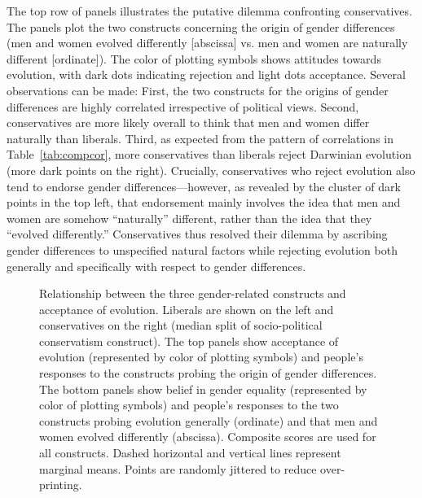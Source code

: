 \documentclass[fignum,man]{apa}\usepackage[]{graphicx}\usepackage[]{color}
\begin{document}
The top row of panels 
illustrates the putative dilemma confronting conservatives. 
The panels plot
the two constructs concerning the origin of gender differences (men and women evolved
differently [abscissa] vs. men and women are naturally different [ordinate]).
The color of plotting symbols shows attitudes towards evolution, with dark
dots indicating rejection and light dots acceptance.
Several observations can be made:
First, the two constructs for the origins of gender differences are highly
correlated irrespective of political views.
Second, conservatives are more likely overall to think that
men and women differ naturally than liberals. 
Third, as expected from the pattern of correlations in 
Table~\ref{tab:compcor}, more conservatives
than liberals reject Darwinian evolution (more dark points on the right). 
Crucially, conservatives
who reject evolution also tend to endorse gender differences---however,
as revealed by the cluster of dark points in the top left, that endorsement mainly involves the idea that men and women are
somehow ``naturally'' different, rather than the idea that they
``evolved differently.'' Conservatives thus
resolved their dilemma by ascribing gender differences to unspecified
natural factors while rejecting evolution both generally and specifically with respect to gender differences.

\begin{figure}[tp] %
\caption{Relationship between the three gender-related
	constructs and acceptance of evolution.
	Liberals are shown on the left and conservatives on the right (median split of socio-political conservatism construct).
	The top panels show
	acceptance of evolution (represented by color
of plotting symbols) and people's responses to the constructs probing the
origin of gender differences. 
	The bottom panels show belief in gender equality (represented by
color of plotting symbols) and people's responses to the two constructs probing evolution generally (ordinate) and that men and women evolved differently (abscissa).
Composite scores are used for all constructs.
Dashed horizontal and vertical lines represent marginal
means. Points are randomly jittered to reduce over-printing.}
\label{fig:conslibevogrid}
\end{figure}
\end{document}
